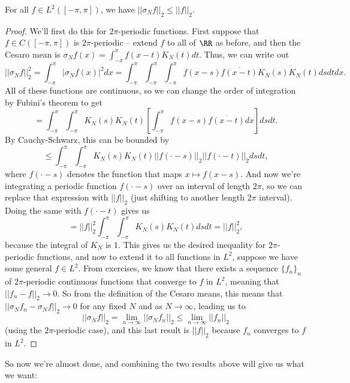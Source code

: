 \begin{proposition}\label{cesaroineq}
For all $f \in L^2([-\pi, \pi])$, we have $||\sigma_N f||_2 \le ||f||_2$.
\end{proposition}
\begin{proof}
We'll first do this for $2\pi$-periodic functions. First suppose that $f \in C([-\pi, \pi])$ is $2\pi$-periodic -- extend $f$ to all of $\RR$ as before, and then the Cesaro mean is $\sigma_Nf(x) = \int_{-\pi}^{\pi} f(x-t) K_N(t) dt$. Thus, we can write out
\[
    \boxed{||\sigma_Nf||_2^2} = \int_{-\pi}^{\pi} |\sigma_Nf(x)|^2 dx = \int_{-\pi}^\pi \int_{-\pi}^\pi \int_{-\pi}^\pi f(x-s) \overline{f(x-t)} K_N(s) K_N(t) ds dt dx.
\]
All of these functions are continuous, so we can change the order of integration by Fubini's theorem to get 
\[
    = \int_{-\pi}^\pi \int_{-\pi}^\pi K_N(s) K_N(t) \left[\int_{-\pi}^{\pi} f(x-s) \overline{f(x-t)} dx\right] ds dt.
\]
By Cauchy-Schwarz, this can be bounded by 
\[
    \le \int_{-\pi}^\pi \int_{-\pi}^\pi K_N(s) K_N(t) ||f(\cdot -s)||_2 ||f(\cdot-t)||_2 ds dt,
\]
where $f(\cdot-s)$ denotes the function that maps $x \mapsto f(x-s)$. And now we're integrating a periodic function $f(\cdot -s)$ over an interval of length $2\pi$, so we can replace that expression with $||f||_2$ (just shifting to another length $2\pi$ interval). Doing the same with $f(\cdot -t)$ gives us
\[
    = ||f||_2^2\int_{-\pi}^\pi \int_{-\pi}^\pi K_N(s) K_N(t)  ds dt = \boxed{||f||_2^2},
\]
because the integral of $K_N$ is $1$. This gives us the desired inequality for $2\pi$-periodic functions, and now to extend it to all functions in $L^2$, suppose we have some general $f \in L^2$. From exercises, we know that there exists a sequence $\{f_n\}_n$ of $2\pi$-periodic continuous functions that converge to $f$ in $L^2$, meaning that $||f_n - f||_2 \to 0$. So from the definition of the Cesaro means, this means that $||\sigma_N f_n - \sigma_N f||_2 \to 0$ for any fixed $N$ and as $N \to \infty$, leading us to 
\[
    ||\sigma_N f||_2 = \lim_{n \to \infty} ||\sigma_N f_n||_2 \le \lim_{n \to \infty} ||f_n||_2
\]
(using the $2\pi$-periodic case), and this last result is $||f||_2$ because $f_n$ converges to $f$ in $L^2$.
\end{proof}

So now we're almost done, and combining the two results above will give us what we want:

